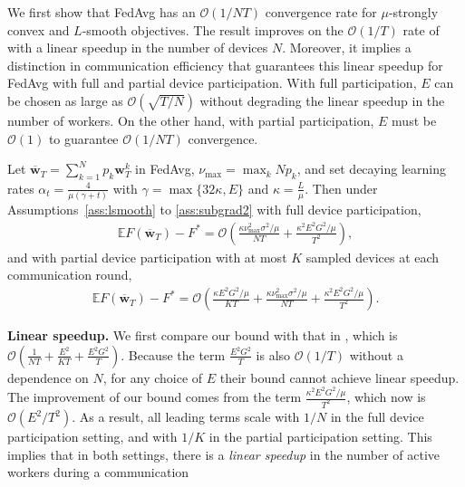We first show that FedAvg has an $\mathcal{O}(1/NT)$ convergence rate
for $\mu$-strongly convex and $L$-smooth objectives. The result
improves on the $\mathcal{O}(1/T)$ rate of \cite{li2019convergence}
with a linear speedup in the number of devices $N$. Moreover, it
implies a distinction in communication efficiency that guarantees
this linear speedup for FedAvg with full and partial device participation.
With full participation, $E$ can be chosen as large as $\mathcal{O}(\sqrt{T/N})$
without degrading the linear speedup in the number of workers. On
the other hand, with partial participation, $E$ must be $\mathcal{O}(1)$
to guarantee $\mathcal{O}(1/NT)$ convergence.
\begin{theorem}
	\label{thm:SGD_scvx}Let $\overline{\mathbf{w}}_{T}=\sum_{k=1}^{N}p_{k}\mathbf{w}_{T}^{k}$ in FedAvg,
	$\nu_{\max}=\max_{k}Np_{k}$, and set decaying learning rates $\alpha_{t}=\frac{4}{\mu(\gamma+t)}$
	with $\gamma=\max\{32\kappa,E\}$ and $\kappa=\frac{L}{\mu}$. Then
	under Assumptions~\ref{ass:lsmooth} to \ref{ass:subgrad2} with full device participation, 
	\begin{align*}
	\mathbb{E}F(\overline{\mathbf{w}}_{T})-F^{\ast}=\mathcal{O}\left(\frac{\kappa\nu_{\max}^{2}\sigma^{2}/\mu}{NT}+\frac{\kappa^{2}E^{2}G^{2}/\mu}{T^{2}}\right),
	\end{align*}
	and with partial device participation with at most $K$ sampled devices
	at each communication round, 
	\begin{align*}
	\mathbb{E}F(\overline{\mathbf{w}}_{T})-F^{\ast}=\mathcal{O}\left(\frac{\kappa E^{2}G^{2}/\mu}{KT}+\frac{\kappa\nu_{\max}^{2}\sigma^{2}/\mu}{NT}+\frac{\kappa^{2}E^{2}G^{2}/\mu}{T^{2}}\right).
	\end{align*}
	\label{th:scvx_sgd}
\end{theorem}
%
\textbf{Linear speedup. }We first compare our bound with that in \cite{li2019convergence},
which is $\mathcal{O}(\frac{1}{NT}+\frac{E^{2}}{KT}+\frac{E^{2}G^{2}}{T})$.
Because the term $\frac{E^{2}G^{2}}{T}$ is also $\mathcal{O}(1/T)$
without a dependence on $N$, for any choice of $E$ their bound cannot
achieve linear speedup. The improvement of our bound comes from the
term $\frac{\kappa^{2}E^{2}G^{2}/\mu}{T^{2}}$, which now is $\mathcal{O}(E^{2}/T^{2})$.
As a result, all leading terms scale with $1/N$ in the full device
participation setting, and with $1/K$ in the partial participation
setting. This implies that in both settings, there is a \emph{linear
	speedup} in the number of active workers during a communication
